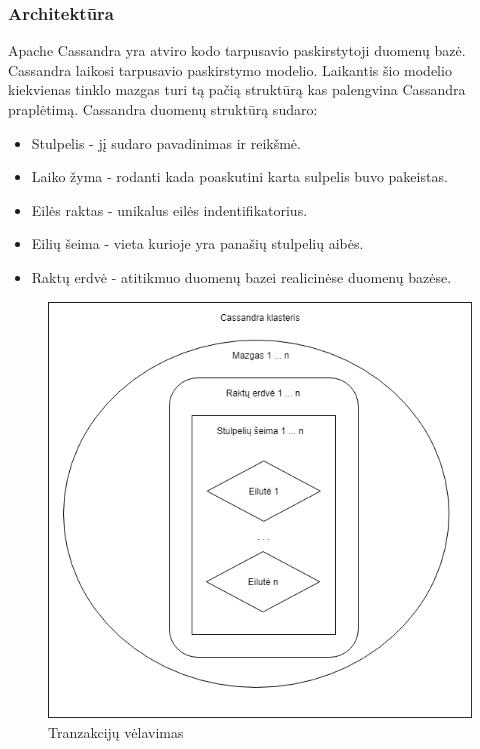 \documentclass{VUMIFPSkursinis}
\begin{document}
		\subsubsection{Architektūra}
			Apache Cassandra yra atviro kodo tarpusavio paskirstytoji duomenų bazė. Cassandra laikosi tarpusavio paskirstymo modelio. Laikantis šio modelio kiekvienas tinklo mazgas turi tą pačią struktūrą kas palengvina Cassandra praplėtimą. 
		\linebreak
		Cassandra duomenų struktūrą sudaro: 
		\begin{itemize}
			\item{Stulpelis - jį sudaro pavadinimas ir reikšmė.}
			\item{Laiko žyma - rodanti kada poaskutini karta sulpelis buvo pakeistas.}
			\item{Eilės raktas - unikalus eilės indentifikatorius.}
			\item{Eilių šeima - vieta kurioje yra panašių stulpelių aibės.}
			\item{Raktų erdvė - atitikmuo duomenų bazei realicinėse duomenų bazėse.}
		\end{itemize}
		\begin{figure}[H]
		    \centering
		    \includegraphics[scale=0.5]{img/CasArch}
		    \caption{Tranzakcijų vėlavimas}   %
		    \label{img:mlp}
		\end{figure}
\end{document}
